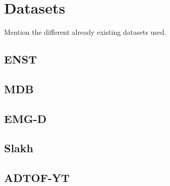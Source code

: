 \chapter{Datasets}

Mention the different already existing datasets used.

\section{ENST}

\section{MDB}

\section{EMG-D}

\section{Slakh}

\section{ADTOF-YT}